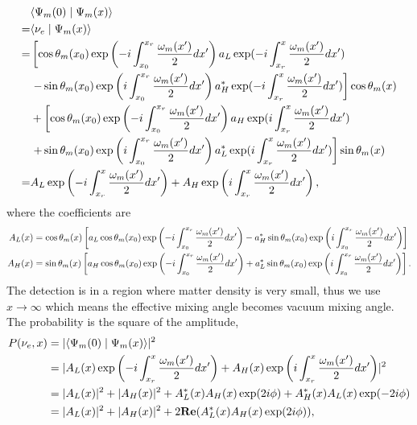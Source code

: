 \documentclass[letterpaper,12pt,english]{sphinxmanual}
\newcommand{\braket}[2]{\langle #1 \mid #2 \rangle}
\begin{document}
\begin{gather}
\begin{split}&\braket{\Psi_m(0)}{\Psi_m(x)} \\
= & \braket{\nu_e}{\Psi_m(x)} \\
= &  \left[ \cos\theta_m(x_0) \exp\left( -i \int_{x_0}^{x_{r}} \frac{\omega_m(x')}{2} dx'   \right)   a_L \exp( -i \int_{x_r}^x \frac{\omega_m(x')}{2}dx' ) \right. \\
&  \left. - \sin\theta_m(x_{0}) \exp\left( i \int_{x_0}^{x_{r}} \frac{\omega_m(x')}{2} dx' \right)    a_H^* \exp( -i \int_{x_r}^x \frac{\omega_m(x')}{2}dx' )  \right]  \cos\theta_m(x) \\
& + \left[  \cos\theta_m(x_0) \exp\left( -i \int_{x_0}^{x_{r}} \frac{\omega_m(x')}{2} dx'   \right) a_H \exp( i\int_{x_r}^x \frac{\omega_m(x')}{2}dx' ) \right. \\
& \left. + \sin\theta_m(x_{0}) \exp\left( i \int_{x_0}^{x_{r}} \frac{\omega_m(x')}{2} dx' \right)   a_L^* \exp( i\int_{x_r}^x \frac{\omega_m(x')}{2}dx' ) \right]  \sin\theta_m(x) \\
=& A_L \exp\left( -i \int_{x_r}^{x} \frac{\omega_m(x')}{2} dx'   \right) + A_H \exp\left( i\int_{x_r}^x \frac{\omega_m(x')}{2}dx' \right),\end{split}\notag
\end{gather}
where the coefficients are
\begin{gather}
\begin{split}A_L(x) & = \cos\theta_m(x) \left[ a_L\cos\theta_m(x_0) \exp\left(  -i\int_{x_0}^{x_r} \frac{\omega_m(x')}{2} dx' \right) - a_H^*\sin\theta_m(x_0) \exp\left( i \int_{x_0}^{x_r} \frac{\omega_m(x')}{2}dx' \right)  \right] \\
A_H(x) & = \sin\theta_m(x)  \left[ a_H \cos\theta_m(x_0) \exp\left( -i \int_{x_0}^{x_{r}} \frac{\omega_m(x')}{2} dx'   \right)   + a_L^*\sin\theta_m(x_{0}) \exp\left( i \int_{x_0}^{x_{r}} \frac{\omega_m(x')}{2} dx' \right)    \right]  .\end{split}\notag
\end{gather}
The detection is in a region where matter density is very small, thus we use \(x\to\infty\) which means the effective mixing angle becomes vacuum mixing angle. The probability is the square of the amplitude,
\begin{gather}
\begin{split}P(\nu_e,x) &= \lvert \braket{\Psi_m(0)}{\Psi_m(x)}  \rvert^2 \\
& = \lvert A_L(x) \exp\left( -i \int_{x_r}^{x} \frac{\omega_m(x')}{2} dx'   \right) + A_H(x) \exp\left( i\int_{x_r}^x \frac{\omega_m(x')}{2}dx' \right)  \rvert^2 \\
& = \lvert A_L(x) \rvert^2 + \lvert A_H(x) \rvert^2 + A_L^*(x) A_H(x) \exp(2i\phi) + A_H^*(x) A_L(x) \exp(-2i\phi) \\
& = \lvert A_L(x) \rvert^2 + \lvert A_H(x) \rvert^2 + 2 \mathbf{Re}( A_L^*(x) A_H(x) \exp(2i\phi) ),\end{split}\notag
\end{gather}
\end{document}
